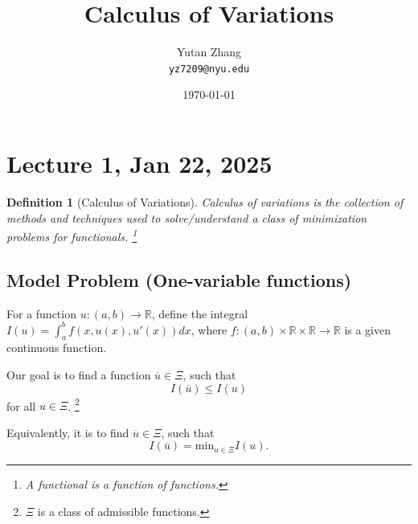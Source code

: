 \documentclass[12pt]{report}
\title{Calculus of Variations}
\author{Yutan Zhang\\ \texttt{yz7209@nyu.edu}}
\date{\today}
\newtheorem{definition}{Definition}[section]
\begin{document}
\maketitle
\tableofcontents
\newpage
\section{Lecture 1, Jan 22, 2025}
\begin{definition}[Calculus of Variations]
Calculus of variations is the collection of methods and techniques used to solve/understand a class of minimization problems for functionals. \footnote{A functional is a function of functions.}
\end{definition}
\subsection{Model Problem (One-variable functions)} 
\hspace*{1.5em}For a function \(u:(a, b) \to \mathbb{R}\), define the integral \(I(u) = \int_a^b f(x, u(x), u'(x)) dx\), where \(f: (a, b) \times \mathbb{R} \times \mathbb{R} \to \mathbb{R}\) is a given continuous function. 

Our goal is to find a function \(\overline{u} \in \Xi\), such that \[I(\overline{u}) \leq I(u)\] for all \(u \in \Xi\).  \footnote{\(\Xi\) is a class of admissible functions. } 

Equivalently, it is to find \(\overline{u} \in \Xi\), such that
\begin{equation}
I(\overline{u}) = \text{min}_{u \in \Xi} I(u). \tag{1}
\end{equation}
\end{document}
